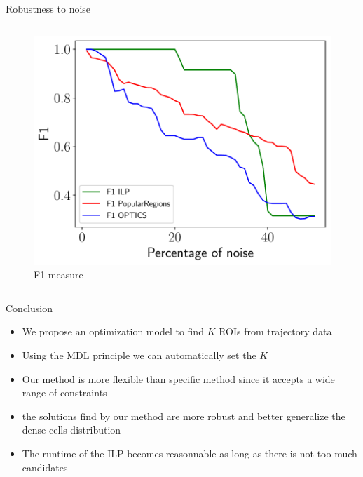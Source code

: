 \documentclass[10pt]{beamer}
\begin{document}
\begin{frame}{Robustness to noise}
\begin{columns}[T, onlytextwidth]
        \begin{figure}
            \centering
            \includegraphics[scale=0.3]{figures/results/f1.pdf}
            \caption{F1-measure}
        \end{figure}
    \end{columns}
\end{frame}

\begin{frame}{Conclusion}
    \begin{itemize}
        \item We propose an optimization model to find $K$ ROIs from trajectory data
        \item Using the MDL principle we can automatically set the $K$
        \item Our method is more flexible than specific method since it accepts a wide range of constraints
        \item the solutions find by our method are more robust and better generalize the dense cells distribution
        \item The runtime of the ILP becomes reasonnable as long as there is not too much candidates
    \end{itemize}
\end{frame}
\end{document}
